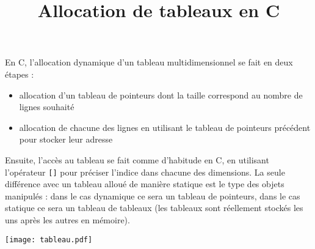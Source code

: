 \documentclass[10pt]{article}\usepackage[enonce]{exemptty}
\title{Allocation de tableaux en C}
\begin{document}
\maketitle

\noindent{}\medskip


 En C, l'allocation dynamique d'un tableau
multidimensionnel se fait
en deux étapes :\\
\begin{minipage}{.5\linewidth}
  \begin{itemize}
  \item allocation d'un tableau de pointeurs dont la taille correspond au
    nombre de lignes souhaité
  \item allocation de chacune des lignes en utilisant le tableau de pointeurs
    précédent pour stocker leur adresse
  \end{itemize}

  Ensuite, l'accès au tableau se fait comme d'habitude en C, en utilisant
  l'opérateur \verb~[]~ pour préciser l'indice dans chacune des dimensions. La seule
  différence avec un tableau alloué de manière statique est le type des objets
  manipulés : dans le cas dynamique ce sera un tableau de pointeurs, dans le
  cas statique ce sera un tableau de tableaux (les tableaux sont réellement
  stockés les uns après les autres en mémoire).

\end{minipage}\hfill\begin{minipage}{.48\linewidth}
  \texttt{[image: tableau.pdf]}
\end{minipage}
\end{document}

